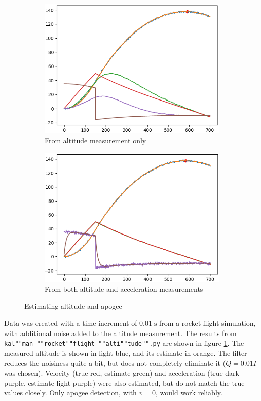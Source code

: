 \documentclass[a4paper]{article}
\renewcommand{\u}[1]{\;\mathrm{#1}}
\begin{document}
\begin{figure}[b]
\centering
\begin{subfigure}[t]{0.48\textwidth}
\centering
\includegraphics[width=\textwidth]{kalman_altitude.png}
\caption{From altitude measurement only} \label{fig:altitude}
\end{subfigure}
\begin{subfigure}[t]{0.48\textwidth}
\centering
\includegraphics[width=\textwidth]{kalman_altitude_accel.png}
\caption{From both altitude and acceleration measurements} \label{fig:altitude_accel}
\end{subfigure}
\caption{Estimating altitude and apogee}
\end{figure}

Data was created with a time increment of $0.01\u{s}$ from a rocket flight simulation, with additional noise added to the altitude measurement. The results from \texttt{kal""man\_""rocket""flight\_""alti""tude"".py} are shown in figure \ref{fig:altitude}. The measured altitude is shown in light blue, and its estimate in orange. The filter reduces the noisiness quite a bit, but does not completely eliminate it ($Q=0.01 I$ was chosen). Velocity (true red, estimate green) and acceleration (true dark purple, estimate light purple) were also estimated, but do not match the true values closely. Only apogee detection, with $v=0$, would work reliably.
\end{document}
